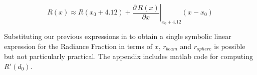 \documentclass{article}
\theoremstyle{plain}
\theoremstyle{definition}
\theoremstyle{remark}
\begin{document}
$$ R(x) \approx R(x_{0} + 4.12) + \left. \frac{\partial \, R(x)}{\partial x} \right|_{x_{0}+4.12} \left( x - x_{0} \right) $$

Substituting our previous expressions in to obtain a single symbolic linear expression for the Radiance Fraction in terms of $x$, $r_{beam}$ and $r_{sphere}$ is possible but not particularly practical.  The appendix includes matlab code for computing $R'(d_{0})$.


%
%
%
\end{document}
